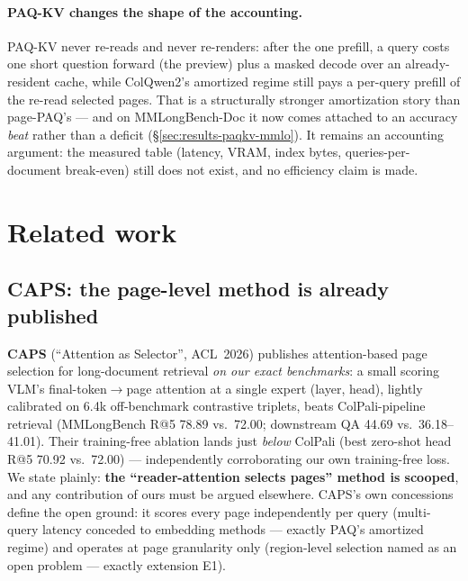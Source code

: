\documentclass[11pt,letterpaper]{article}
\newcommand{\paq}{\textsc{PAQ}}
\newcommand{\paqc}{\textsc{PAQ-KV}}
\begin{document}
\paragraph{\paqc{} changes the shape of the accounting.} \paqc{} never re-reads and never
re-renders: after the one prefill, a query costs one short question forward (the preview) plus
a masked decode over an already-resident cache, while ColQwen2's amortized regime still pays a
per-query prefill of the re-read selected pages. That is a structurally stronger amortization
story than page-\paq{}'s --- and on MMLongBench-Doc it now comes attached to an accuracy
\emph{beat} rather than a deficit (\S\ref{sec:results-paqkv-mmlo}). It remains an accounting
argument: the measured table (latency, VRAM, index bytes, queries-per-document break-even)
still does not exist, and no efficiency claim is made.

\section{Related work}\label{sec:related}

\subsection{CAPS: the page-level method is already published}\label{sec:related-caps}
\textbf{CAPS} \citep{zhu2026caps} (``Attention as Selector'', ACL~2026) publishes attention-based
page selection for long-document retrieval \emph{on our exact benchmarks}: a small scoring VLM's
final-token$\to$page attention at a single expert (layer, head), lightly calibrated on 6.4k
off-benchmark contrastive triplets, beats ColPali-pipeline retrieval (MMLongBench R@5 78.89 vs.\
72.00; downstream QA 44.69 vs.\ 36.18--41.01). Their training-free ablation lands just \emph{below}
ColPali (best zero-shot head R@5 70.92 vs.\ 72.00) --- independently corroborating our own
training-free loss. We state plainly: \textbf{the ``reader-attention selects pages'' method is
scooped}, and any contribution of ours must be argued elsewhere. CAPS's own concessions define
the open ground: it scores every page independently per query (multi-query latency conceded to
embedding methods --- exactly \paq's amortized regime) and operates at page granularity only
(region-level selection named as an open problem --- exactly extension E1).
\end{document}
